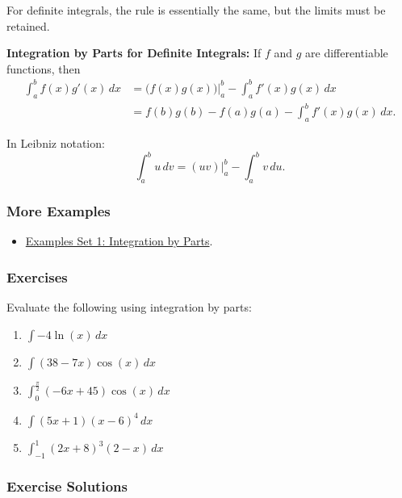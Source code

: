 For definite integrals, the rule is essentially the same, but the limits must be retained.

\textbf{Integration by Parts for Definite Integrals:}  
If $f$ and $g$ are differentiable functions, then
\begin{align}
\int_a^b f(x) g'(x)\,dx 
&= \bigl(f(x)g(x)\bigr)\Big|_a^b - \int_a^b f'(x) g(x)\,dx \\
&= f(b)g(b) - f(a)g(a) - \int_a^b f'(x) g(x)\,dx.
\end{align}

In Leibniz notation:
\[
\int_a^b u\,dv = (uv)\Big|_a^b - \int_a^b v\,du.
\]

\subsubsection{More Examples}
\label{sss:more-cdfa}

\begin{itemize}
\item \href{http://en.wikiversity.org/wiki/Application_of_Integration_by_Parts}{Examples Set 1: Integration by Parts}.
\end{itemize}

\subsubsection{Exercises}
\label{sss:exer-ef8a}

Evaluate the following using integration by parts:

\begin{enumerate}
\item $\int -4\ln(x)\,dx$
\item $\int (38-7x)\cos(x)\,dx$
\item $\int_0^{\tfrac{\pi}{2}} (-6x+45)\cos(x)\,dx$
\item $\int (5x+1)(x-6)^4\,dx$
\item $\int_{-1}^1 (2x+8)^3(2-x)\,dx$
\end{enumerate}

\subsubsection{Exercise Solutions}
\label{sss:exer-1604}

